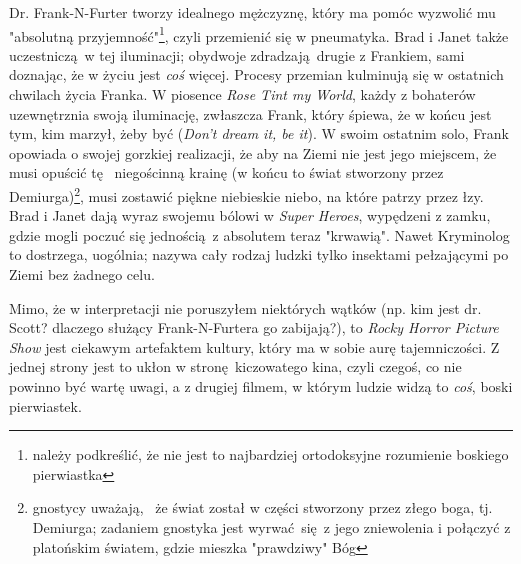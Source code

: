 \documentclass[12pt]{minimal}
\begin{document}
Dr. Frank-N-Furter tworzy idealnego mężczyznę, który ma pomóc wyzwolić
mu "absolutną przyjemność"\footnote{ należy podkreślić, że nie jest to najbardziej
ortodoksyjne rozumienie boskiego pierwiastka}, czyli przemienić się w pneumatyka.
Brad i Janet także uczestniczą w tej iluminacji; obydwoje zdradzają drugie z Frankiem,
sami doznając, że w życiu jest \emph{coś} więcej. Procesy przemian kulminują się w  ostatnich
chwilach życia Franka. W piosence \textit{Rose Tint my World}, każdy z bohaterów
uzewnętrznia swoją iluminację, zwłaszcza Frank, który śpiewa, że w końcu jest tym, kim
marzył, żeby być (\textit{Don't dream it, be it}). W swoim ostatnim solo, Frank opowiada o
swojej gorzkiej realizacji, że aby na Ziemi nie jest jego miejscem, że musi opuścić tę 
niegościnną krainę (w końcu to świat stworzony przez Demiurga)\footnote{gnostycy uważają, 
że świat został w części stworzony przez złego boga, tj. Demiurga; zadaniem gnostyka jest
wyrwać się z jego zniewolenia i połączyć z platońskim światem, gdzie mieszka "prawdziwy"
Bóg}, musi zostawić piękne niebieskie niebo, na które patrzy przez łzy. Brad i Janet dają
wyraz swojemu bólowi w \textit{Super Heroes}, wypędzeni z zamku, gdzie mogli poczuć się
jednością z absolutem teraz "krwawią". Nawet Kryminolog to dostrzega, uogólnia; nazywa cały
rodzaj ludzki tylko insektami pełzającymi po Ziemi bez żadnego celu.

Mimo, że w interpretacji nie poruszyłem niektórych wątków (np. kim jest dr. Scott? dlaczego służący Frank-N-Furtera go zabijają?), to
\textit{Rocky Horror Picture Show} jest ciekawym artefaktem kultury, który ma w sobie aurę tajemniczości.
Z jednej strony jest to ukłon w stronę kiczowatego kina, czyli czegoś, co nie powinno być wartę uwagi, a z
drugiej filmem, w którym ludzie widzą to \emph{coś}, boski pierwiastek.
\end{document}
